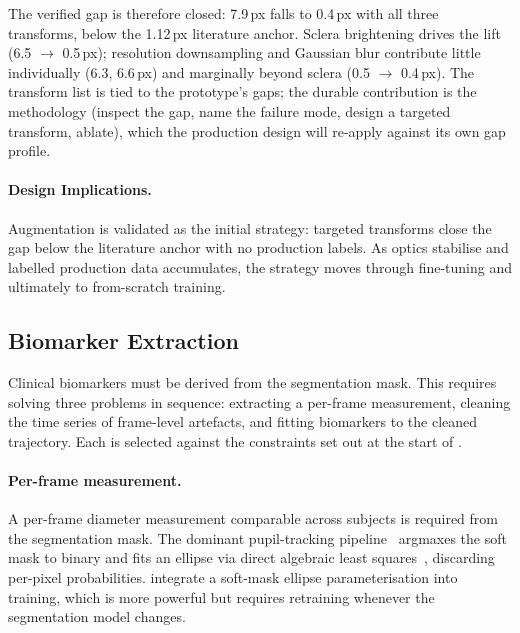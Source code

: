The verified gap is therefore closed: 7.9\,px falls to 0.4\,px with all three transforms, below the 1.12\,px literature anchor. Sclera brightening drives the lift (6.5 $\to$ 0.5\,px); resolution downsampling and Gaussian blur contribute little individually (6.3, 6.6\,px) and marginally beyond sclera (0.5 $\to$ 0.4\,px). The transform list is tied to the prototype's gaps; the durable contribution is the methodology (inspect the gap, name the failure mode, design a targeted transform, ablate), which the production design will re-apply against its own gap profile.

\paragraph{Design Implications.} Augmentation is validated as the initial strategy: targeted transforms close the gap below the literature anchor with no production labels. As optics stabilise and labelled production data accumulates, the strategy moves through fine-tuning and ultimately to from-scratch training.

\subsection{Biomarker Extraction}
\label{sec:biomarker-extraction}

Clinical  biomarkers must be derived from the segmentation mask. This requires solving three problems in sequence: extracting a per-frame measurement, cleaning the time series of frame-level artefacts, and fitting biomarkers to the cleaned trajectory. Each is selected against the constraints set out at the start of .

\paragraph{Per-frame measurement.} A per-frame diameter measurement comparable across subjects is required from the segmentation mask. The dominant pupil-tracking pipeline~\cite{yiu2019deepvog, chaudhary2019ritnet, kothari2021ellseg} argmaxes the soft mask to binary and fits an ellipse via direct algebraic least squares~\cite{fitzgibbon1999direct}, discarding per-pixel probabilities. \citet{jia2024condseg} integrate a soft-mask ellipse parameterisation into training, which is more powerful but requires retraining whenever the segmentation model changes.

